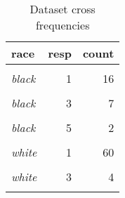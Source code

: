 \begin{table}[ht]

\caption{\label{tab:dataset_crosscount}Dataset cross frequencies}
\centering
\begin{tabular}[t]{>{}lrr}
\toprule
race & resp & count\\
\midrule
\em{\cellcolor{gray!6}{black}} & \cellcolor{gray!6}{0} & \cellcolor{gray!6}{119}\\
\em{black} & 1 & 16\\
\em{\cellcolor{gray!6}{black}} & \cellcolor{gray!6}{2} & \cellcolor{gray!6}{12}\\
\em{black} & 3 & 7\\
\em{\cellcolor{gray!6}{black}} & \cellcolor{gray!6}{4} & \cellcolor{gray!6}{3}\\
\addlinespace
\em{black} & 5 & 2\\
\em{\cellcolor{gray!6}{white}} & \cellcolor{gray!6}{0} & \cellcolor{gray!6}{1070}\\
\em{white} & 1 & 60\\
\em{\cellcolor{gray!6}{white}} & \cellcolor{gray!6}{2} & \cellcolor{gray!6}{14}\\
\em{white} & 3 & 4\\
\addlinespace
\em{\cellcolor{gray!6}{white}} & \cellcolor{gray!6}{6} & \cellcolor{gray!6}{1}\\
\bottomrule
\end{tabular}
\end{table}
